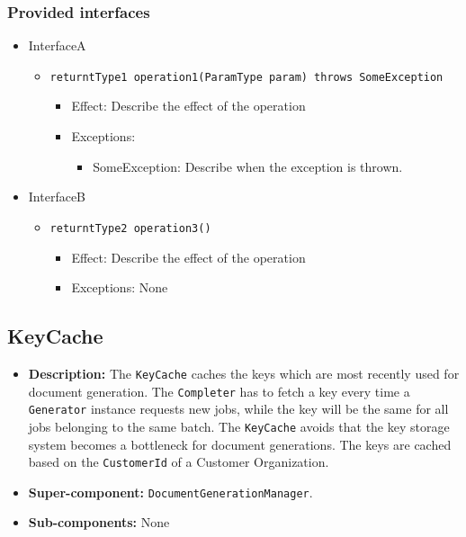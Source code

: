 \documentclass[a4paper,10pt]{article}
\begin{document}
\subsubsection*{Provided interfaces}
\begin{itemize}
    \item InterfaceA
    \begin{itemize}
        \item \texttt{returntType1 operation1(ParamType param) throws SomeException}
        \begin{itemize}
            \item Effect: Describe the effect of the operation
            \item Exceptions:
            \begin{itemize}
                \item SomeException: Describe when the exception is thrown.
            \end{itemize}
        \end{itemize}
    \end{itemize}

    \item InterfaceB
    \begin{itemize}
        \item \texttt{returntType2 operation3()}
        \begin{itemize}
            \item Effect: Describe the effect of the operation
            \item Exceptions: None
        \end{itemize}
    \end{itemize}
\end{itemize}

\subsection{KeyCache}
\begin{itemize}
    \item \textbf{Description:} The \texttt{KeyCache} caches the keys which are most recently used for document generation. The \texttt{Completer} has to fetch a key every time a \texttt{Generator} instance requests new jobs, while the key will be the same for all jobs belonging to the same batch. The \texttt{KeyCache} avoids that the key storage system becomes a bottleneck for document generations. The keys are cached based on the \texttt{CustomerId} of a Customer Organization.
    \item \textbf{Super-component:}  \texttt{DocumentGenerationManager}.
    \item \textbf{Sub-components:} None
\end{itemize}
\end{document}
